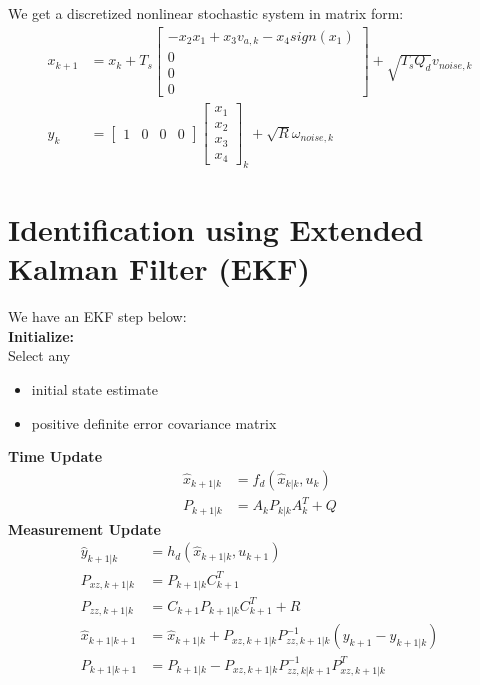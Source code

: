 \documentclass[12pt,a4paper]{article}
\begin{document}
	We get a discretized nonlinear stochastic system in matrix form:
	\begin{equation}
		\boxed{\begin{split}
				x_{k+1} &= x_k + T_s
				\begin{bmatrix}
					-x_2 x_1 + x_3 v_{a,k} - x_4sign(x_1) \\
					0                                     \\
					0                                     \\
					0                                     
				\end{bmatrix} +\sqrt{T_s Q_d}v_{noise,k}\\
				y_k &= 
				\begin{bmatrix}
					1 & 0 & 0 & 0 
				\end{bmatrix}
				\begin{bmatrix}
					x_1 \\
					x_2 \\
					x_3 \\
					x_4 
				\end{bmatrix}_k+\sqrt{R}\omega_{noise,k}
		\end{split}}
		\label{eq12}
	\end{equation}
	\pagebreak
	\section{Identification using Extended Kalman Filter (EKF)}
	We have an EKF step below:\\
	\textbf{Initialize:}\\
	Select any
	\begin{itemize}
		\item { initial state estimate}
		\item { positive definite error covariance matrix}
	\end{itemize}
	\textbf{Time Update}
	\begin{equation}
		\begin{split}
			\hat{x}_{k+1|k} &= f_d(\hat{x}_{k|k},u_k)\\
			P_{k+1|k} &= A_kP_{k|k}A^T_k+Q
		\end{split}
		\label{eq13}
	\end{equation}
	\textbf{Measurement Update}
	\begin{equation}
		\begin{split}
			\hat{y}_{k+1|k} &= h_d(\hat{x}_{k+1|k},u_{k+1})\\
			P_{xz,k+1|k}    &= P_{k+1|k}C^T_{k+1}\\
			P_{zz,k+1|k}    &= C_{k+1}P_{k+1|k}C^T_{k+1}+R\\
			\hat{x}_{k+1|k+1} &= \hat{x}_{k+1|k} + P_{xz,k+1|k}P^{-1}_{zz,k+1|k}(y_{k+1}-\hat{y}_{k+1|k})\\
			P_{k+1|k+1}     &= P_{k+1|k} - P_{xz,k+1|k}P^{-1}_{zz,k|k+1}P^T_{xz,k+1|k} 
		\end{split}
		\label{eq14}
	\end{equation}
	
\end{document}
